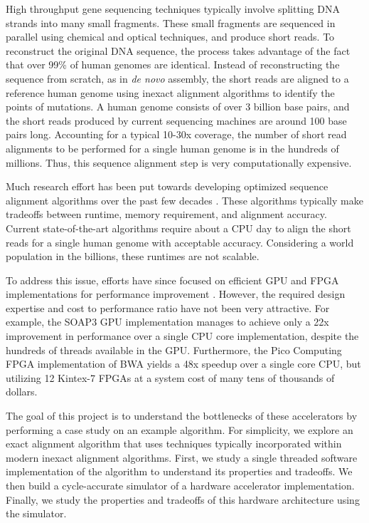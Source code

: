 \documentclass[11pt]{article}
\begin{document}
High throughput gene sequencing techniques typically involve splitting DNA strands into many small fragments.  These small fragments are sequenced in parallel using chemical and optical techniques, and produce short reads.  To reconstruct the original DNA sequence, the process takes advantage of the fact that over 99\% of human genomes are identical.  Instead of reconstructing the sequence from scratch, as in \textit{de novo} assembly, the short reads are aligned to a reference human genome using inexact alignment algorithms to identify the points of mutations.  A human genome consists of over 3 billion base pairs, and the short reads produced by current sequencing machines are around 100 base pairs long.  Accounting for a typical 10-30x coverage, the number of short read alignments to be performed for a single human genome is in the hundreds of millions.  Thus, this sequence alignment step is very computationally expensive.


	Much research effort has been put towards developing optimized sequence alignment algorithms over the past few decades \cite{smith1981textordfeminineidentification, altschul1990basic, ning2001ssaha, toh2009basic, zaharia2011faster, li2009fast}.  These algorithms typically make tradeoffs between runtime, memory requirement, and alignment accuracy.  Current state-of-the-art algorithms require about a CPU day to align the short reads for a single human genome with acceptable accuracy.  Considering a world population in the billions, these runtimes are not scalable.


To address this issue, efforts have since focused on efficient GPU and FPGA implementations for performance improvement \cite{klus2012barracuda, liu2012soap3, okawa2012pico}.  However, the required design expertise and cost to performance ratio have not been very attractive.  For example, the SOAP3 GPU implementation manages to achieve only a 22x improvement in performance over a single CPU core implementation, despite the hundreds of threads available in the GPU.  Furthermore, the Pico Computing FPGA implementation of BWA yields a 48x speedup over a single core CPU, but utilizing 12 Kintex-7 FPGAs at a system cost of many tens of thousands of dollars.


The goal of this project is to understand the bottlenecks of these accelerators by performing a case study on an example algorithm.  For simplicity, we explore an exact alignment algorithm that uses techniques typically incorporated within modern inexact alignment algorithms.  First, we study a single threaded software implementation of the algorithm to understand its properties and tradeoffs.  We then build a cycle-accurate simulator of a hardware accelerator implementation.  Finally, we study the properties and tradeoffs of this hardware architecture using the simulator.
\end{document}
